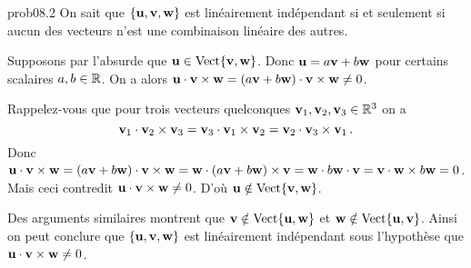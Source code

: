 \begin{sol}{prob08.2}
\soln On sait que $\set{\uu,\vv,\ww}$ est linéairement indépendant si et seulement si aucun des vecteurs n'est une combinaison linéaire des autres. 

Supposons par l'absurde que $\uu\in \sp{\vv,\ww}$. Donc $\uu= a\vv + b \ww$ pour certains scalaires $a,b \in \R$. On a alors $\uu\cdot \vv\times \ww=(a\vv + b \ww)\cdot \vv\times \ww\not=0$. 

Rappelez-vous que pour trois vecteurs quelconques $\vv_1, \vv_2, \vv_3 \in \R^3$ on a $$\vv_1\cdot \vv_2\times \vv_3=\vv_3\cdot \vv_1\times \vv_2=\vv_2\cdot \vv_3\times \vv_1\,.$$ Donc $\uu\cdot \vv\times \ww=(a\vv + b \ww)\cdot \vv\times \ww =\ww\cdot (a\vv + b \ww)\times \vv=\ww \cdot b\ww \cdot \vv= \vv\cdot \ww \times b\ww=0$. Mais ceci contredit $\uu\cdot \vv\times \ww \not=0$. D'o\`u $\uu\notin \sp{\vv,\ww}$.

Des arguments similaires montrent que $\vv\notin \sp{\uu,\ww}$ et $\ww\notin \sp{\uu,\vv}$. Ainsi on peut conclure que $\set{\uu,\vv,\ww}$ est linéairement indépendant sous l'hypothèse que $\uu\cdot \vv\times \ww \not=0$.

\medskip 
 
\end{sol}